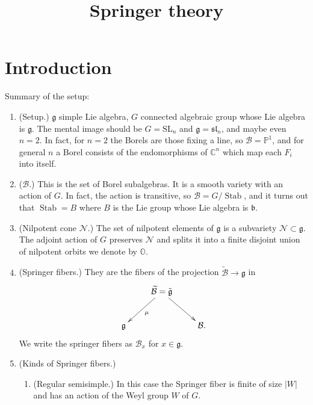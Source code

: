 



\title{Springer theory}
\maketitle


\section{Introduction}
\label{section-intro}
\noindent
Summary of the setup:
\begin{enumerate}
\item (Setup.) $\mathfrak{g}$ simple Lie
algebra, $G$ connected algebraic group
whose Lie algebra is $\mathfrak{g}$.
The mental image should be $G=\text{SL}_n$
and $\mathfrak{g}=\mathfrak{sl}_n$,
and maybe even $n=2$.
In fact, for $n=2$ the Borels
are those fixing a line, so
$\mathcal{B}=\mathbb{P}^1$,
and for general $n$ a Borel consists
of the endomorphisms of $\mathbb{C}^n$
which map each $F_i$ into itself.

\item ($\mathcal{B}$.) 
This is the set of
Borel subalgebras. It is a smooth
variety with an action of $G$.
In fact, the action is transitive,
so $\mathcal{B} = G/\operatorname{Stab}$,
and it turns out that
$\operatorname{Stab} = B$ where
$B$ is the Lie group whose Lie algebra
is $\mathfrak{b}$.

\item (Nilpotent cone $\mathcal{N}$.)
The set of nilpotent elements of $\mathfrak{g}$
is a subvariety $\mathcal{N} \subset
\mathfrak{g}$. The adjoint action of $G$
preserves $\mathcal{N}$ and splits it
into a finite disjoint union of
nilpotent orbits we denote by $\mathbb{O}$.

\item (Springer fibers.) They are the fibers
of the projection 
$\tilde{\mathcal{B}} \to \mathfrak{g}$ in
$$
\xymatrix{
&  \widetilde{\mathcal{B}}
=\tilde{\mathfrak{g}}\ar[dl]^{\mu}\ar[dr]\\
\mathfrak{g}&&\mathcal{B}.
}
$$
We write the springer fibers as
$\mathcal{B}_x$ for $x \in \mathfrak{g}$.

\item (Kinds of Springer fibers.)
\begin{enumerate}
\item (Regular semisimple.) In this case
the Springer fiber is finite of size
$|W|$ and has an action
of the Weyl group $W$ of $G$.


\end{enumerate}
\end{enumerate}
